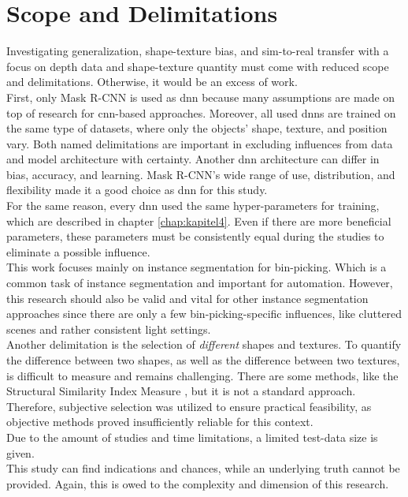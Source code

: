 	\section{Scope and Delimitations}
	\label{sec:scope-and-delimitations}
		Investigating generalization, shape-texture bias, and sim-to-real transfer with a focus on depth data and shape-texture quantity must come with reduced scope and delimitations. Otherwise, it would be an excess of work. \\
		First, only Mask R-CNN \cite{Kaiming2017} is used as \ac{dnn} because many assumptions are made on top of research for \ac{cnn}-based approaches.
		Moreover, all used \ac{dnn}s are trained on the same type of datasets, where only the objects' shape, texture, and position vary.
		Both named delimitations are important in excluding influences from data and model architecture with certainty. Another \ac{dnn} architecture can differ in bias, accuracy, and learning. Mask R-CNN's wide range of use, distribution, and flexibility made it a good choice as \ac{dnn} for this study.\\
		For the same reason, every \ac{dnn} used the same hyper-parameters for training, which are described in chapter \ref{chap:kapitel4}. Even if there are more beneficial parameters, these parameters must be consistently equal during the studies to eliminate a possible influence.\\
		This work focuses mainly on instance segmentation for bin-picking. Which is a common task of instance segmentation and important for automation\cite{Raj2023}\cite{Danielczuk2019}\cite{Xie2021}. However, this research should also be valid and vital for other instance segmentation approaches since there are only a few bin-picking-specific influences, like cluttered scenes and rather consistent light settings.\\
		Another delimitation is the selection of \textit{different} shapes and textures. To quantify the difference between two shapes, as well as the difference between two textures, is difficult to measure and remains challenging. There are some methods, like the Structural Similarity Index Measure \cite{Wang2004}, but it is not a standard approach. Therefore, subjective selection was utilized to ensure practical feasibility, as objective methods proved insufficiently reliable for this context.
		\\
		Due to the amount of studies and time limitations, a limited test-data size is given.\\
		This study can find indications and chances, while an underlying truth cannot be provided. Again, this is owed to the complexity and dimension of this research.\\
